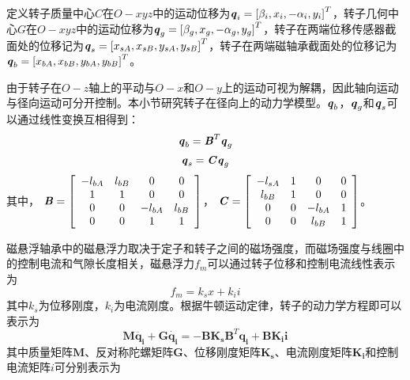 \documentclass[
  lang=cn,
  degree=master,
  openany,oneside
]{nuaathesis}
\begin{document}
定义转子质量中心$ C $在$ O-xyz $中的运动位移为${\textbf{\textit{q}}_i} = {\left[ {{\beta _i},{x_i}, - {\alpha _i},{y_i}} \right]^T}$，转子几何中心$ G $在$ O-xyz $中的运动位移为${\textbf{\textit{q}}_g} = {\left[ {{\beta _g},{x_g}, - {\alpha _g},{y_g}} \right]^T}$，转子在两端位移传感器截面处的位移记为${\textbf{\textit{q}}_s} = {\left[ {{x_{sA}},{x_{sB}},{y_{sA}},{y_{sB}}} \right]^T}$，转子在两端磁轴承截面处的位移记为${\textbf{\textit{q}}_b} = {\left[ {{x_{bA}},{x_{bB}},{y_{bA}},{y_{bB}}} \right]^T}$。

由于转子在$ O-z $轴上的平动与$ O-x $和$ O-y $上的运动可视为解耦，因此轴向运动与径向运动可分开控制。本小节研究转子在径向上的动力学模型。$ \textbf{\textit{q}}_{b} $，$ \textbf{\textit{q}}_{g} $和$ \textbf{\textit{q}}_{s} $可以通过线性变换互相得到：
\begin{equation}
\label{eq2-1}
{\textbf{\textit{q}}_b} = {\textbf{\textit{B}}^T}{\textbf{\textit{q}}_g}
\end{equation}
\begin{equation}
\label{eq2-2}
{\textbf{\textit{q}}_s} = \textbf{\textit{C}}{\textbf{\textit{q}}_g}
\end{equation}
其中，
${\textbf{\textit{B}}} = \left[ {\begin{array}{*{20}{c}}
{ - {l_{bA}}}&{{l_{bB}}}&0&0\\
1&1&0&0\\
0&0&{ - {l_{bA}}}&{{l_{bB}}}\\
0&0&1&1
\end{array}} \right]$，
${\textbf{\textit{C}}} = \left[ {\begin{array}{*{20}{c}}
{ - {l_{sA}}}&{1}&0&0\\
{l_{bB}}&1&0&0\\
0&0&{ - {l_{bA}}}&{1}\\
0&0&{l_{bB}}&1
\end{array}} \right]$。

磁悬浮轴承中的磁悬浮力取决于定子和转子之间的磁场强度，而磁场强度与线圈中的控制电流和气隙长度相关，磁悬浮力$ {f_m} $可以通过转子位移和控制电流线性表示为
\begin{equation}
\label{eq2-3}
{f_m} = {k_s}x + {k_i}i
\end{equation}
其中${k_s}$为位移刚度，${k_i}$为电流刚度。根据牛顿运动定律，转子的动力学方程即可以表示为
\begin{equation}
\label{eq2-4}
\boldsymbol{M} \ddot{\boldsymbol{q_i}} + \boldsymbol{G}\dot{\boldsymbol{q_i}} =  - \boldsymbol{B}\boldsymbol{K_s} {\boldsymbol{B}}^T \boldsymbol{q_i} + \boldsymbol{B} \boldsymbol{K_i} \boldsymbol{i}
\end{equation}
其中质量矩阵$\boldsymbol{M}$、反对称陀螺矩阵$\boldsymbol{G}$、位移刚度矩阵$\boldsymbol{K_s}$、电流刚度矩阵$\boldsymbol{K_i}$和控制电流矩阵$i$可分别表示为
\end{document}
